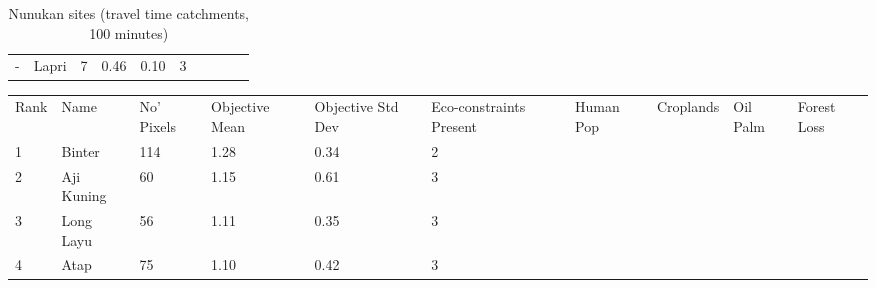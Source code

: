 \begin{table}[ht]
\begin{tabular}{C{0.05\textwidth}C{0.15\textwidth}C{0.08\textwidth}C{0.08\textwidth}C{0.08\textwidth}C{0.08\textwidth}C{0.08\textwidth}C{0.08\textwidth}C{0.08\textwidth}C{0.08\textwidth}}
  {-} & Lapri &   7 & \textcolor[HTML]{000000}{0.46} & \textcolor[HTML]{000000}{0.10} & \textcolor[HTML]{000000}{3} &  &  &  &  \\ 
  \end{tabular}
\endgroup
\caption{Nunukan sites (travel time catchments, 100 minutes)} 
\label{tab:nunukan_time}
\end{table}
\begin{table}[ht]
\centering
\begingroup\fontsize{9pt}{10pt}\selectfont
\begin{tabular}{C{0.05\textwidth}C{0.15\textwidth}C{0.08\textwidth}C{0.08\textwidth}C{0.08\textwidth}C{0.08\textwidth}C{0.08\textwidth}C{0.08\textwidth}C{0.08\textwidth}C{0.08\textwidth}}
 Rank & Name & No' Pixels & Objective Mean & Objective Std Dev & Eco-constraints  Present & Human Pop & Croplands & Oil Palm & Forest Loss \\ 
 {1} & Binter & 114 & \textcolor[HTML]{FFFFFF}{1.28} & \textcolor[HTML]{000000}{0.34} & \textcolor[HTML]{000000}{2} &  &  &  &  \\ 
  {2} & Aji Kuning &  60 & \textcolor[HTML]{FFFFFF}{1.15} & \textcolor[HTML]{FFFFFF}{0.61} & \textcolor[HTML]{000000}{3} &  &  &  &  \\ 
  {3} & Long Layu &  56 & \textcolor[HTML]{FFFFFF}{1.11} & \textcolor[HTML]{000000}{0.35} & \textcolor[HTML]{000000}{3} &  &  &  &  \\ 
  {4} & Atap &  75 & \textcolor[HTML]{FFFFFF}{1.10} & \textcolor[HTML]{FFFFFF}{0.42} & \textcolor[HTML]{000000}{3} &  &  &  &  \\ 

\end{tabular}
\end{table}
